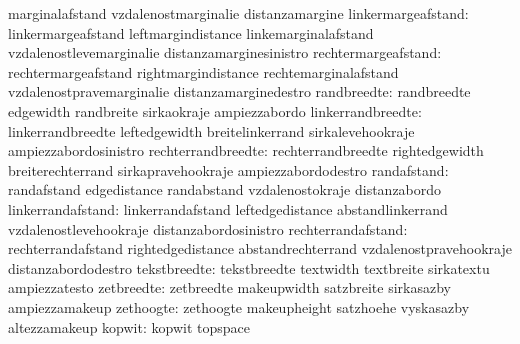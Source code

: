                                   marginalafstand                  vzdalenostmarginalie
                                  distanzamargine
              linkermargeafstand: linkermargeafstand               leftmargindistance
                                  linkemarginalafstand             vzdalenostlevemarginalie
                                  distanzamarginesinistro
             rechtermargeafstand: rechtermargeafstand              rightmargindistance
                                  rechtemarginalafstand            vzdalenostpravemarginalie
                                  distanzamarginedestro
                     randbreedte: randbreedte                      edgewidth
                                  randbreite                       sirkaokraje
                                  ampiezzabordo
               linkerrandbreedte: linkerrandbreedte                leftedgewidth
                                  breitelinkerrand                 sirkalevehookraje
                                  ampiezzabordosinistro
              rechterrandbreedte: rechterrandbreedte               rightedgewidth
                                  breiterechterrand                sirkapravehookraje
                                  ampiezzabordodestro
                     randafstand: randafstand                      edgedistance
                                  randabstand                      vzdalenostokraje
                                  distanzabordo
               linkerrandafstand: linkerrandafstand                leftedgedistance
                                  abstandlinkerrand                vzdalenostlevehookraje
                                  distanzabordosinistro
              rechterrandafstand: rechterrandafstand               rightedgedistance
                                  abstandrechterrand               vzdalenostpravehookraje
                                  distanzabordodestro
                    tekstbreedte: tekstbreedte                     textwidth
                                  textbreite                       sirkatextu
                                  ampiezzatesto
                      zetbreedte: zetbreedte                       makeupwidth
                                  satzbreite                       sirkasazby
                                  ampiezzamakeup                   %
                       zethoogte: zethoogte                        makeupheight
                                  satzhoehe                        vyskasazby
                                  altezzamakeup
                          kopwit: kopwit                           topspace
